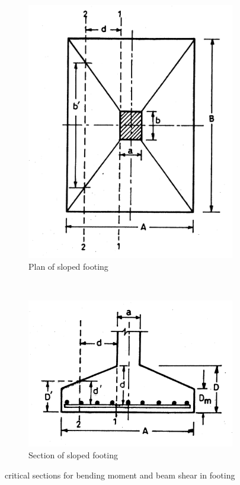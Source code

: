 \documentclass{report}
\begin{document}
\begin{figure}
  \centering
  \begin{subfigure}[b]{0.5\textwidth}
    \includegraphics[width=\textwidth]{images/fig2321.png}
    \caption{Plan of sloped footing}
    \label{fig:1}
  \end{subfigure}\\
  \begin{subfigure}[b]{0.5\textwidth}
    \includegraphics[width=\textwidth]{images/fig2322.png}
    \caption{Section of sloped footing}
    \label{fig:2}
  \end{subfigure}
\caption{critical sections for bending moment and beam shear in footing}
\end{figure}
\end{document}
